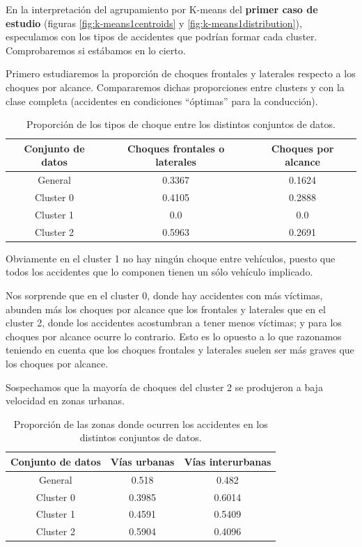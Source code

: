 \documentclass[oneside]{book}
\begin{document}
En la interpretación del agrupamiento por K-means del \textbf{primer
  caso de estudio} (figuras \ref{fig:k-means1centroids} y
\ref{fig:k-means1distribution}), especulamos con los tipos de
accidentes que podrían formar cada cluster. Comprobaremos si estábamos
en lo cierto.

Primero estudiaremos la proporción de choques frontales y laterales
respecto a los choques por alcance. Compararemos dichas proporciones
entre clusters y con la clase completa (accidentes en condiciones
``óptimas'' para la conducción).

\begin{table}[H]
  \centering
\begin{tabular}{|c|cc|}
  \hline
  Conjunto de datos & Choques frontales o laterales & Choques por alcance \\ \hline
  General & 0.3367 & 0.1624 \\ \hline
  Cluster 0 & 0.4105 & 0.2888 \\ \hline
  Cluster 1 & 0.0 & 0.0 \\ \hline
  Cluster 2 & 0.5963 & 0.2691 \\ \hline
\end{tabular}
\caption{Proporción de los tipos de choque entre los distintos conjuntos de datos.}
\label{tab:prop-choques1}
\end{table}

Obviamente en el cluster 1 no hay ningún choque entre vehículos,
puesto que todos los accidentes que lo componen tienen un sólo
vehículo implicado.

Nos sorprende que en el cluster 0, donde hay accidentes con más
víctimas, abunden más los choques por alcance que los frontales y
laterales que en el cluster 2, donde los accidentes acostumbran a
tener menos víctimas; y para los choques por alcance ocurre lo
contrario. Esto es lo opuesto a lo que razonamos teniendo en cuenta
que los choques frontales y laterales suelen ser más graves que los
choques por alcance.

Sospechamos que la mayoría de choques del cluster 2 se produjeron a
baja velocidad en zonas urbanas. 

\begin{table}[H]
  \centering
\begin{tabular}{|c|cc|}
  \hline
  Conjunto de datos & Vías urbanas & Vías interurbanas \\ \hline
  General & 0.518 & 0.482 \\ \hline
  Cluster 0 & 0.3985 & 0.6014 \\ \hline
  Cluster 1 & 0.4591 & 0.5409 \\ \hline
  Cluster 2 & 0.5904 & 0.4096 \\ \hline
\end{tabular}
\caption{Proporción de las zonas donde ocurren los accidentes en los distintos conjuntos de datos.}
\label{tab:prop-urbanas1}
\end{table}
\end{document}
